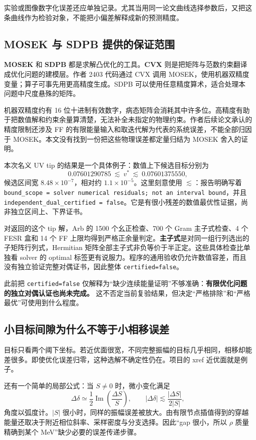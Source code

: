 \documentclass[UTF8,a4paper,11pt,fontset=fandol]{ctexart}
\numberwithin{equation}{section}
\newcommand{\Imm}{\operatorname{Im}}
\newcommand{\code}[1]{{\urlstyle{tt}\nolinkurl{#1}}}
\begin{document}
实验或图像数字化误差还应单独记录。尤其当用同一论文曲线选择参数后，又把这条曲线作为检验对象，不能把小偏差解释成新的预测精度。

\subsection{MOSEK 与 SDPB 提供的保证范围}
\textbf{MOSEK} 和 \textbf{SDPB} 都是求解凸优化的工具。\textbf{CVX} 则是把矩阵与范数约束翻译成优化问题的建模层。作者 2403 代码通过 CVX 调用 MOSEK，使用机器双精度变量；算子可事先用更高精度生成。SDPB 可以使用任意精度算术，适合处理本问题中尺度悬殊的矩阵。

机器双精度约有 16 位十进制有效数字，病态矩阵会消耗其中许多位。高精度有助于把数值解和约束余量算清楚，无法补全未指定的物理约束。作者后续论文承认的精度限制还涉及 FF 的有限能量输入和取迭代解为代表的系统误差，不能全部归因于 MOSEK。本文没有找到一份把这些物理误差都定量归结为 MOSEK 舍入的证明。\cite{hk24,hk25,code24}

本次名义 UV tip 的结果是一个具体例子：数值上下候选目标分别为
\begin{equation}
0.07601290785\ \lesssim\ v^*\ \lesssim\ 0.07601375550,
\end{equation}
候选区间宽 \(8.48\times10^{-7}\)，相对约 \(1.1\times10^{-5}\)。这里刻意使用 \(\lesssim\)：报告明确写着 \code{bound_scope = solver numerical residuals; not an interval bound}，并且 \code{independent_dual_certified = false}。它是有很小残差的数值最优性证据，尚非独立区间上、下界证书。

对返回的这个 tip 解，Arb 的 1500 个幺正检查、700 个 Gram 主子式检查、4 个 FESR 盒和 14 个 FF 上限均得到严格正余量判定。\textbf{主子式}是对同一组行列选出的子矩阵行列式，Hermitian 矩阵全部主子式非负等价于半正定。这些具体检查比单独看 solver 的 optimal 标签更有说服力。程序的通用验收仍允许数值容差，而且没有独立验证完整对偶证书，因此整体 \code{certified=false}。

此前把 \code{certified=false} 仅解释为“缺少连续能量证明”不够准确：\textbf{有限优化问题的独立对偶认证也尚未完成。} 这不否定当前复验结果，但决定“严格排除”和“严格最优”可使用到什么程度。

\subsection{小目标间隙为什么不等于小相移误差}
目标只看两个阈下坐标。若近优面很宽，不同完整振幅的目标几乎相同，相移却能差很多。即使优化误差归零，这种选解不确定性仍在。项目的 xref 近优面就是例子。

还有一个简单的局部公式：当 \(S\neq0\) 时，微小变化满足
\begin{equation}
\Delta\delta\simeq\frac12\Imm\left(\frac{\Delta S}{S}\right),\qquad
|\Delta\delta|\lesssim\frac{|\Delta S|}{2|S|},
\end{equation}
角度以弧度计。\(|S|\) 很小时，同样的振幅误差被放大。由有限节点插值得到的穿越能量还取决于附近相位斜率、采样密度与分支选择。因此“gap 很小，所以 \(\rho\) 质量精确到某个 MeV”缺少必要的误差传递步骤。
\end{document}
